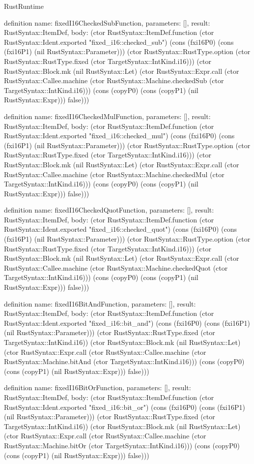 \begin{lexlean}{RustRuntime}
\begin{semanticmodule}
definition{
  name: fixedI16CheckedSubFunction,
  parameters: [],
  result: RustSyntax::ItemDef,
  body: (ctor RustSyntax::ItemDef.function (ctor RustSyntax::Ident.exported "fixed_i16::checked_sub") (cons (fxi16P0) (cons (fxi16P1) (nil RustSyntax::Parameter))) (ctor RustSyntax::RustType.option (ctor RustSyntax::RustType.fixed (ctor TargetSyntax::IntKind.i16))) (ctor RustSyntax::Block.mk (nil RustSyntax::Let) (ctor RustSyntax::Expr.call (ctor RustSyntax::Callee.machine (ctor RustSyntax::Machine.checkedSub (ctor TargetSyntax::IntKind.i16))) (cons (copyP0) (cons (copyP1) (nil RustSyntax::Expr))) false)))
}

definition{
  name: fixedI16CheckedMulFunction,
  parameters: [],
  result: RustSyntax::ItemDef,
  body: (ctor RustSyntax::ItemDef.function (ctor RustSyntax::Ident.exported "fixed_i16::checked_mul") (cons (fxi16P0) (cons (fxi16P1) (nil RustSyntax::Parameter))) (ctor RustSyntax::RustType.option (ctor RustSyntax::RustType.fixed (ctor TargetSyntax::IntKind.i16))) (ctor RustSyntax::Block.mk (nil RustSyntax::Let) (ctor RustSyntax::Expr.call (ctor RustSyntax::Callee.machine (ctor RustSyntax::Machine.checkedMul (ctor TargetSyntax::IntKind.i16))) (cons (copyP0) (cons (copyP1) (nil RustSyntax::Expr))) false)))
}

definition{
  name: fixedI16CheckedQuotFunction,
  parameters: [],
  result: RustSyntax::ItemDef,
  body: (ctor RustSyntax::ItemDef.function (ctor RustSyntax::Ident.exported "fixed_i16::checked_quot") (cons (fxi16P0) (cons (fxi16P1) (nil RustSyntax::Parameter))) (ctor RustSyntax::RustType.option (ctor RustSyntax::RustType.fixed (ctor TargetSyntax::IntKind.i16))) (ctor RustSyntax::Block.mk (nil RustSyntax::Let) (ctor RustSyntax::Expr.call (ctor RustSyntax::Callee.machine (ctor RustSyntax::Machine.checkedQuot (ctor TargetSyntax::IntKind.i16))) (cons (copyP0) (cons (copyP1) (nil RustSyntax::Expr))) false)))
}

definition{
  name: fixedI16BitAndFunction,
  parameters: [],
  result: RustSyntax::ItemDef,
  body: (ctor RustSyntax::ItemDef.function (ctor RustSyntax::Ident.exported "fixed_i16::bit_and") (cons (fxi16P0) (cons (fxi16P1) (nil RustSyntax::Parameter))) (ctor RustSyntax::RustType.fixed (ctor TargetSyntax::IntKind.i16)) (ctor RustSyntax::Block.mk (nil RustSyntax::Let) (ctor RustSyntax::Expr.call (ctor RustSyntax::Callee.machine (ctor RustSyntax::Machine.bitAnd (ctor TargetSyntax::IntKind.i16))) (cons (copyP0) (cons (copyP1) (nil RustSyntax::Expr))) false)))
}

definition{
  name: fixedI16BitOrFunction,
  parameters: [],
  result: RustSyntax::ItemDef,
  body: (ctor RustSyntax::ItemDef.function (ctor RustSyntax::Ident.exported "fixed_i16::bit_or") (cons (fxi16P0) (cons (fxi16P1) (nil RustSyntax::Parameter))) (ctor RustSyntax::RustType.fixed (ctor TargetSyntax::IntKind.i16)) (ctor RustSyntax::Block.mk (nil RustSyntax::Let) (ctor RustSyntax::Expr.call (ctor RustSyntax::Callee.machine (ctor RustSyntax::Machine.bitOr (ctor TargetSyntax::IntKind.i16))) (cons (copyP0) (cons (copyP1) (nil RustSyntax::Expr))) false)))
}


\end{semanticmodule}
\end{lexlean}
